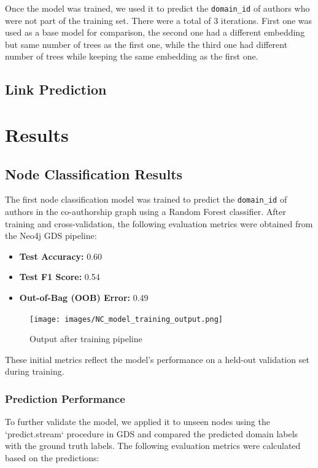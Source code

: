 \documentclass[conference, 12pt]{IEEEtran}
\begin{document}
Once the model was trained, we used it to predict the \texttt{domain\_id} of authors who were not part of the 
training set. There were a total of 3 iterations. First one was used as a base model for comparison, the second one had
a different embedding but same number of trees as the first one, while the third one had different number of trees while keeping
the same embedding as the first one.


\subsection{Link Prediction}

\section{Results}


\subsection{Node Classification Results}
The first node classification model was trained to predict the \texttt{domain\_id} of authors in the co-authorship graph using a Random Forest classifier. After training and cross-validation, the following evaluation metrics were obtained from the Neo4j GDS pipeline:

\begin{itemize}
  \item \textbf{Test Accuracy:} 0.60
  \item \textbf{Test F1 Score:} 0.54
  \item \textbf{Out-of-Bag (OOB) Error:} 0.49
\end{itemize}

\begin{figure}[h]
    \centering
    \texttt{[image: images/NC\_model\_training\_output.png]} 
    \caption{Output after training pipeline}
    \label{fig:classification_metrics}
\end{figure}

These initial metrics reflect the model’s performance on a held-out validation set during training.

\subsubsection{Prediction Performance}
To further validate the model, we applied it to unseen nodes using the `predict.stream` procedure in GDS and compared the predicted domain labels with the ground truth labels. The following evaluation metrics were calculated based on the predictions:
\end{document}
